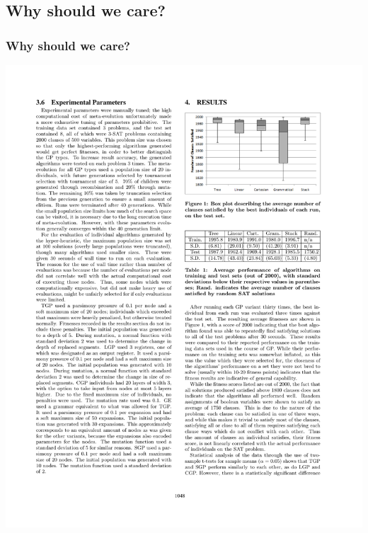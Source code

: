 \documentclass{beamer}
\begin{document}
\subsection{Why should we care?}
\begin{frame}
	\frametitle{Why should we care?}
	\includegraphics[width=1\textwidth]{Illustrations/gpvariant_graph.PDF}
	\\
\end{frame}
\end{document}
